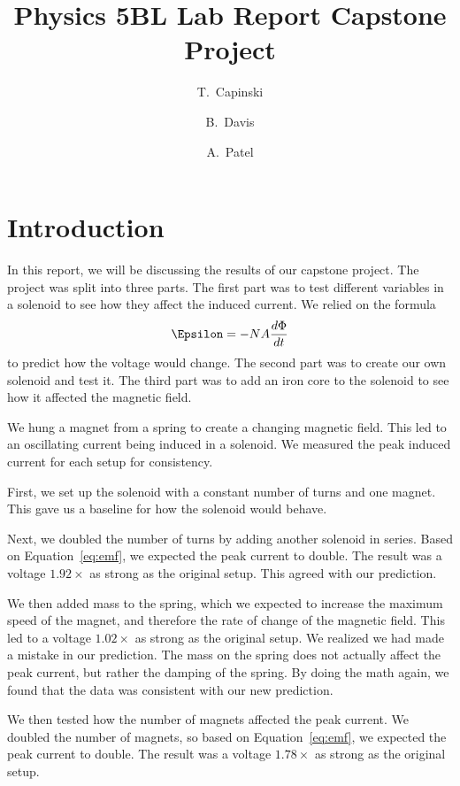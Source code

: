 \documentclass[11pt]{article}
\title{Physics 5BL Lab Report Capstone Project}
\author{T.~Capinski \and B.~Davis \and A.~Patel}
\let\oldsection\section
\renewcommand\section{\clearpage\oldsection}
\begin{document}
    \maketitle
    \tableofcontents

    \section*{Introduction}\label{sec:introduction}

    In this report, we will be discussing the results of our capstone project.
    The project was split into three parts.
    The first part was to test different variables in a solenoid to see how they affect the induced current.
    We relied on the formula
    \begin{equation}
        \Epsilon = -N A \frac{d\Phi}{dt}
        \label{eq:emf}
    \end{equation}
    to predict how the voltage would change.
    The second part was to create our own solenoid and test it.
    The third part was to add an iron core to the solenoid to see how it affected the magnetic field.

    We hung a magnet from a spring to create a changing magnetic field.
    This led to an oscillating current being induced in a solenoid.
    We measured the peak induced current for each setup for consistency.

    First, we set up the solenoid with a constant number of turns and one magnet.
    This gave us a baseline for how the solenoid would behave.

    Next, we doubled the number of turns by adding another solenoid in series.
    Based on Equation~\ref{eq:emf}, we expected the peak current to double.
    The result was a voltage $1.92 \times$ as strong as the original setup.
    This agreed with our prediction.

    We then added mass to the spring, which we expected to increase the maximum speed of the magnet, and therefore the rate of change of the magnetic field.
    This led to a voltage $1.02 \times$ as strong as the original setup.
    We realized we had made a mistake in our prediction.
    The mass on the spring does not actually affect the peak current, but rather the damping of the spring.
    By doing the math again, we found that the data was consistent with our new prediction.

    We then tested how the number of magnets affected the peak current.
    We doubled the number of magnets, so based on Equation~\ref{eq:emf}, we expected the peak current to double.
    The result was a voltage $1.78 \times$ as strong as the original setup.
\end{document}
